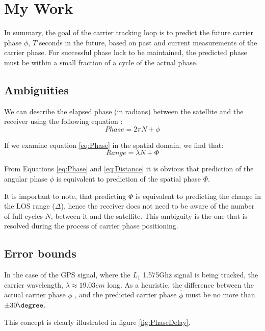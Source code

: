\chapter{My Work}\label{ch:MyWork}
\label{ch:TrackingLoops}


In summary, the goal of the carrier tracking loop is to predict the future carrier phase $\phi$, $T$ seconds in the future, based on past and current measurements of the carrier phase. For successful phase lock to be maintained, the predicted phase must be within a small fraction of a cycle of the actual phase. 

\section{Ambiguities}

We can describe the elapsed phase (in radians) between the satellite and the receiver using the following equation :  
\begin{equation}
Phase = 2 \pi N  + \phi 
\label{eq:Phase}
\end{equation}

If we examine equation \ref{eq:Phase} in the spatial domain, we find that: 
\begin{equation}
Range = \lambda N + \Phi
\label{eq:Distance}
\end{equation}

From Equations \ref{eq:Phase} and \ref{eq:Distance} it is obvious that prediction of the angular phase $\phi$ is equivalent to prediction of the spatial phase $\Phi$.

It is important to note, that predicting $\Phi$ is equivalent to predicting the change in the LOS range ($\Delta$), hence the receiver does not need to be aware of the number of full cycles $N$, between it and the satellite. This ambiguity is the one that is resolved during the process of carrier phase positioning. 

\section{Error bounds}
In the case of the GPS signal, where the $L_1$ 1.575Ghz signal is being tracked, the carrier wavelength, $\lambda \approx 19.03 cm$ long. As a heuristic, the difference between the actual carrier phase $\phi$ , and the predicted carrier phase $\hat{\phi}$ must be no more than $\pm30 \degree$. 

This concept is clearly illustrated in figure \ref{fig:PhaseDelay}. 

